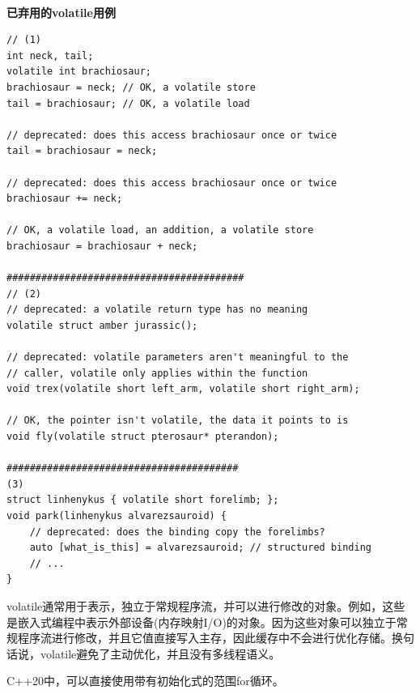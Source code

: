 \hspace*{\fill} \\ %
\noindent
\textbf{已弃用的volatile用例}
\begin{lstlisting}[style=styleCXX]
// (1)
int neck, tail;
volatile int brachiosaur;
brachiosaur = neck; // OK, a volatile store
tail = brachiosaur; // OK, a volatile load

// deprecated: does this access brachiosaur once or twice
tail = brachiosaur = neck;

// deprecated: does this access brachiosaur once or twice
brachiosaur += neck;

// OK, a volatile load, an addition, a volatile store
brachiosaur = brachiosaur + neck;

#########################################
// (2)
// deprecated: a volatile return type has no meaning
volatile struct amber jurassic();

// deprecated: volatile parameters aren't meaningful to the
// caller, volatile only applies within the function
void trex(volatile short left_arm, volatile short right_arm);

// OK, the pointer isn't volatile, the data it points to is
void fly(volatile struct pterosaur* pterandon);

########################################
(3)
struct linhenykus { volatile short forelimb; };
void park(linhenykus alvarezsauroid) {
	// deprecated: does the binding copy the forelimbs?
	auto [what_is_this] = alvarezsauroid; // structured binding
	// ...
}
\end{lstlisting}

\begin{tcolorbox}[breakable,enhanced jigsaw,colback=red!5!white,colframe=red!75!black,title={volatile和多线程语义}]
volatile通常用于表示，独立于常规程序流，并可以进行修改的对象。例如，这些是嵌入式编程中表示外部设备(内存映射I/O)的对象。因为这些对象可以独立于常规程序流进行修改，并且它值直接写入主存，因此缓存中不会进行优化存储。换句话说，volatile避免了主动优化，并且没有多线程语义。
\end{tcolorbox}


C++20中，可以直接使用带有初始化式的范围for循环。

